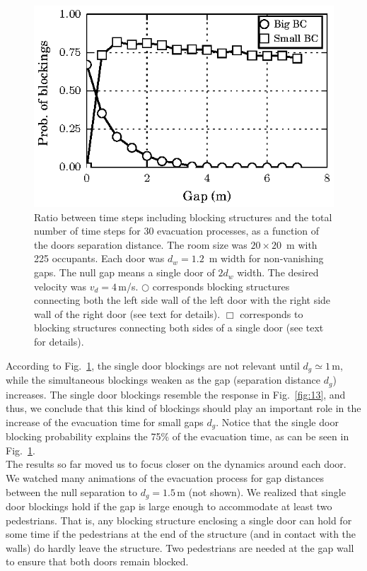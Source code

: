 \begin{figure}
\includegraphics[width=\columnwidth]{./fig12.eps}
\caption{\label{fig:14} Ratio between time steps including blocking structures 
and the total number of time steps for 30 evacuation processes, as a function 
of the doors separation distance. The room size was $20\times20$~m with 225 
occupants. Each door was $d_w=1.2$~m width for non-vanishing gaps. The null gap 
means a single door of $2d_w$ width. The desired velocity was $v_d=4\,$m/s.  
$\bigcirc$ corresponds blocking structures connecting both the left side wall 
of the left door with the right side wall of the right door (see text for 
details). $\Box$ corresponds to blocking structures connecting both sides of a 
single door (see text for details).   }
\end{figure}

According to Fig.~\ref{fig:14}, the single door blockings are not relevant 
until $d_g\simeq1\,$m, while the simultaneous blockings weaken as the gap 
(separation distance $d_g$) increases. The single door blockings resemble the 
response in Fig.~\ref{fig:13}, and thus, we conclude that this kind of 
blockings should play an important role in the increase of the evacuation time 
for small gaps $d_g$. Notice that the single door blocking probability explains the 
75\% of the evacuation time, as can be seen in Fig.~\ref{fig:14}. \\

The results so far moved us to focus closer on the dynamics around each door. 
We watched many animations of the evacuation process for gap distances between 
the null separation to $d_g=1.5\,$m (not shown). We realized that single 
door blockings hold if the gap is large enough to accommodate at least two 
pedestrians. That is, any blocking structure enclosing a single door can hold 
for some time if the pedestrians at the end of the structure (and in contact 
with the walls) do hardly leave the structure. Two pedestrians are needed at the 
gap wall to ensure that both doors remain blocked.\\ 

